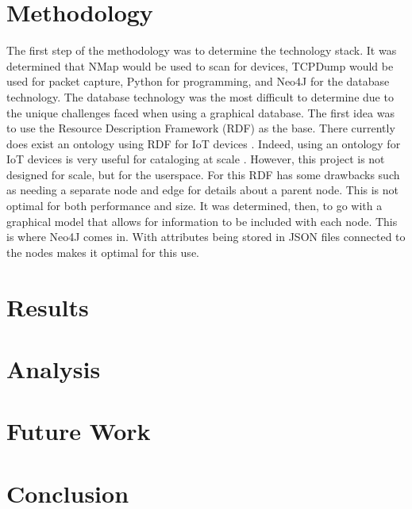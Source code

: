 \documentclass[conference]{IEEEtran}
\begin{document}
\section{Methodology}
The first step of the methodology was to determine the technology stack. It was determined that NMap would be used
to scan for devices, TCPDump would be used for packet capture, Python for programming, and Neo4J for the database
technology. The database technology was the most difficult to determine due to the unique challenges faced 
when using a graphical database. The first idea was to use the Resource Description Framework (RDF) as the base.
There currently does exist an ontology using RDF for IoT devices \cite{RDFIoT}. Indeed, using an ontology for IoT devices
is very useful for cataloging at scale \cite{IoTSmartOntology}. However, this project is not designed for scale, but for
the userspace. For this RDF has some drawbacks such as needing a separate node and edge for details about a parent node.
This is not optimal for both performance and size. It was determined, then, to go with a graphical model that allows
for information to be included with each node. This is where Neo4J comes in. With attributes being stored in JSON files
connected to the nodes makes it optimal for this use.

\section{Results}

\section{Analysis}

\section{Future Work}

\section{Conclusion}

\printbibliography
\end{document}
